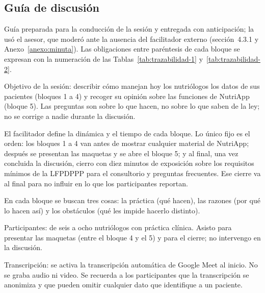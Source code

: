 \documentclass[12pt, a4paper]{article}
\begin{document}
\subsection{Guía de discusión}
\label{anexo:guia}
 
Guía preparada para la conducción de la sesión y entregada con anticipación; la usó el asesor, que moderó ante la ausencia del facilitador externo (sección~4.3.1 y Anexo~\ref{anexo:minuta}). Las obligaciones entre paréntesis de cada bloque se expresan con la numeración de las Tablas~\ref{tab:trazabilidad-1} y~\ref{tab:trazabilidad-2}.
 
Objetivo de la sesión: describir cómo manejan hoy los nutriólogos los datos de sus pacientes (bloques 1 a 4) y recoger su opinión sobre las funciones de NutriApp (bloque 5). Las preguntas son sobre lo que hacen, no sobre lo que saben de la ley; no se corrige a nadie durante la discusión.
 
El facilitador define la dinámica y el tiempo de cada bloque. Lo único fijo es el orden: los bloques 1 a 4 van antes de mostrar cualquier material de NutriApp; después se presentan las maquetas y se abre el bloque 5; y al final, una vez concluida la discusión, cierro con diez minutos de exposición sobre los requisitos mínimos de la LFPDPPP para el consultorio y preguntas frecuentes. Ese cierre va al final para no influir en lo que los participantes reportan.
 
En cada bloque se buscan tres cosas: la práctica (qué hacen), las razones (por qué lo hacen así) y los obstáculos (qué les impide hacerlo distinto).
 
Participantes: de seis a ocho nutriólogos con práctica clínica. Asisto para presentar las maquetas (entre el bloque 4 y el 5) y para el cierre; no intervengo en la discusión.
 
Transcripción: se activa la transcripción automática de Google Meet al inicio. No se graba audio ni video. Se recuerda a los participantes que la transcripción se anonimiza y que pueden omitir cualquier dato que identifique a un paciente.
 
\end{document}
